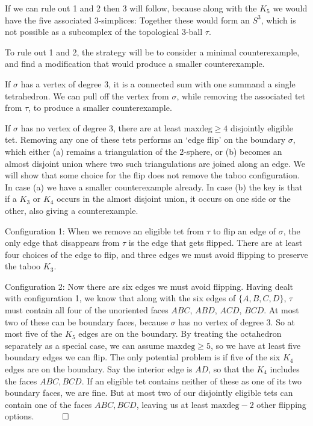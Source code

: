 \documentclass[12pt]{article}
\newcommand{\proofend}{$\quad \qed$}
\newcommand{\kw}{\mathrm}
\newcommand{\maxdeg}{\kw{maxdeg}}
\begin{document}
If we can rule out 1 and 2 then 3 will follow, because
along with the $K_5$ we would have the five associated 3-simplices:
Together these would form an $S^3$, which is not possible as a subcomplex
of the topological 3-ball $\tau$.

To rule out 1 and 2,
the strategy will be to consider a minimal counterexample,
and find a modification that would produce a smaller counterexample.

If $\sigma$ has a vertex of degree 3,
it is a connected sum with one summand a single tetrahedron.
We can pull off the vertex from $\sigma$, while removing the associated
tet from $\tau$, to produce a smaller counterexample.

If $\sigma$ has no vertex of degree 3,
there are at least $\maxdeg \geq 4$ disjointly eligible tet.
Removing any one of these tets performs an `edge flip' on the boundary
$\sigma$,
which either (a) remains a triangulation of the 2-sphere,
or (b) becomes an almost disjoint union where
two such triangulations are joined along an edge.
We will show that some choice for the flip does not remove the taboo
configuration.
In case (a) we have a smaller counterexample already.
In case (b) the key is that if a $K_3$ or $K_4$ occurs
in the almost disjoint union, it occurs on one side or the other,
also giving a counterexample.

Configuration 1:
When we remove an eligible tet from $\tau$ to flip an edge of $\sigma$,
the only edge that disappears from $\tau$ is the edge that gets flipped.
There are at least four choices of the edge to flip, and three edges we must
avoid flipping to preserve the taboo $K_3$.

Configuration 2:
Now there are six edges we must avoid flipping.
Having dealt with configuration 1,
we know that along with the six edges of $\{A,B,C,D\}$,
$\tau$ must contain all four of the unoriented faces
$ABC$, $ABD$, $ACD$, $BCD$.
At most two of these can be boundary faces, because
$\sigma$ has no vertex of degree 3.
So at most five of the $K_5$ edges are on the boundary.
By treating the octahedron separately as a special case,
we can assume $\maxdeg \geq 5$,
so we have at least five boundary edges we can flip.
The only potential problem is if five of the six $K_4$ edges are
on the boundary.
Say the interior edge is $AD$,
so that the $K_4$ includes the faces $ABC,BCD$.
If an eligible tet contains neither of these as one of its two boundary faces,
we are fine.
But at most two of our disjointly eligible tets
can contain one of the faces $ABC,BCD$,
leaving us at least $\maxdeg-2$ other flipping options.
\proofend



\end{document}
